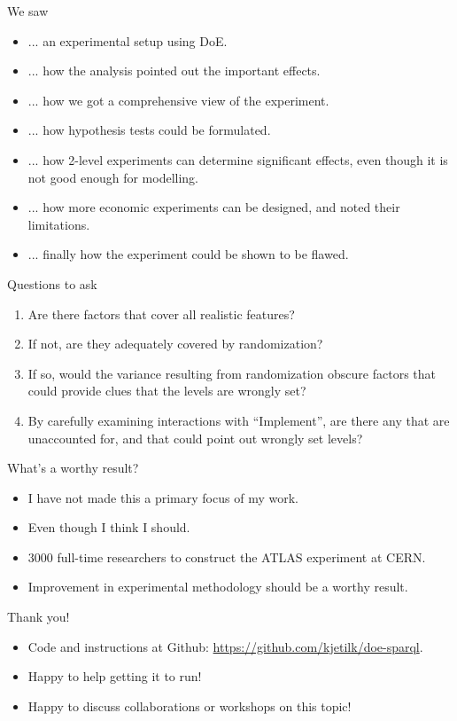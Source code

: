 \documentclass[english,usenames,dvipsnames,aspectratio=169]{beamer}
\begin{document}
\begin{frame}
We saw
  \begin{itemize}
  \item ... an experimental setup using DoE.
  \item ... how the analysis pointed out the important effects.
  \item ... how we got a comprehensive view of the experiment.
  \item ... how hypothesis tests could be formulated.
  \item ... how 2-level experiments can determine significant effects,
    even though it is not good enough for modelling.
  \item ... how more economic experiments can be designed, and noted
    their limitations.
  \item ... finally how the experiment could be shown to be flawed.
  \end{itemize}
\end{frame}

\begin{frame}{Questions to ask}

\begin{enumerate}
\item Are there factors that cover all realistic features?
\item If not, are they adequately covered by randomization?
\item If so, would the variance resulting from randomization obscure
  factors that could provide clues that the levels are wrongly set?
\item By carefully examining interactions with ``Implement'', are
  there any that are unaccounted for, and that could point out wrongly
  set levels?
\end{enumerate}

  
\end{frame}

\begin{frame}{What's a worthy result?}
  \begin{itemize}
  \item I have not made this a primary focus of my work.
  \item Even though I think I should.
  \item 3000 full-time researchers to construct the ATLAS experiment
    at CERN.
  \item Improvement in experimental methodology should be a worthy result.
  \end{itemize}


\end{frame}


\begin{frame}{Thank you!}

  \begin{itemize}
  \item Code and instructions at Github:
    \url{https://github.com/kjetilk/doe-sparql}.
  \item Happy to help getting it to run!
  \item Happy to discuss collaborations or workshops on this topic!
  \end{itemize}

\end{frame}
\end{document}
